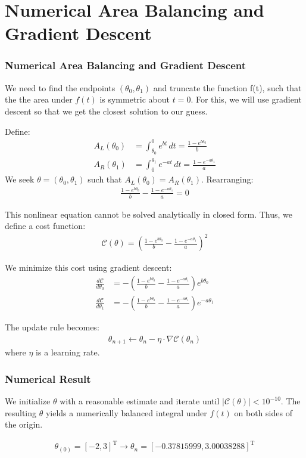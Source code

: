 \documentclass{beamer}
\theoremstyle{remark}
\numberwithin{equation}{section}
\begin{document}
\section{Numerical Area Balancing and Gradient Descent}
\begin{frame}
\frametitle{Numerical Area Balancing and Gradient Descent}
We need to find the endpoints $(\theta_0, \theta_1)$ and truncate the function f(t), such that the the area under $f(t)$ is symmetric about $t=0$. For this, we will use gradient descent so that we get the closest solution to our guess.
	
	Define:
	\begin{align}
		A_L(\theta_0) &= \int_{\theta_0}^{0} e^{bt} \, dt = \frac{1 - e^{b\theta_0}}{b} \\
		A_R(\theta_1) &= \int_{0}^{\theta_1} e^{-at} \, dt = \frac{1 - e^{-a\theta_1}}{a}
	\end{align}
	We seek $\theta = (\theta_0, \theta_1)$ such that $A_L(\theta_0) = A_R(\theta_1)$. Rearranging:
	\begin{align}
		\frac{1 - e^{b\theta_0}}{b} - \frac{1 - e^{-a\theta_1}}{a} = 0
	\end{align}
\end{frame}

\begin{frame}
This nonlinear equation cannot be solved analytically in closed form. Thus, we define a cost function:
	\begin{align}
		\mathcal{C}(\theta) =\left(  \frac{1 - e^{b\theta_0}}{b} - \frac{1 - e^{-a\theta_1}}{a} \right) ^ 2
	\end{align}
	
	We minimize this cost using gradient descent:
	\begin{align}
		\frac{d\mathcal{C}}{d\theta_0} &= -\left(  \frac{1 - e^{b\theta_0}}{b} - \frac{1 - e^{-a\theta_1}}{a} \right) e^{b\theta_0} \\
		\frac{d\mathcal{C}}{d\theta_1} &= -\left(  \frac{1 - e^{b\theta_0}}{b} - \frac{1 - e^{-a\theta_1}}{a} \right) e^{-a\theta_1}
	\end{align}
	
	The update rule becomes:
	\begin{align}
		\theta_{n+1} \leftarrow \theta_{n} - \eta \cdot \nabla \mathcal{C}(\theta_n)
	\end{align}
	where $\eta$ is a learning rate.
\end{frame}

\begin{frame}
\frametitle{Numerical Result}
We initialize $\theta$ with a reasonable estimate and iterate until $|\mathcal{C}(\theta)| < 10^{-10}$. The resulting $\theta$ yields a numerically balanced integral under $f(t)$ on both sides of the origin.
	
	\begin{align}
		\theta_{(0)} = [-2, 3]^\text{T} \rightarrow \theta_{n} = [-0.37815999 , 3.00038288]^\text{T}
	\end{align}
\end{frame}
\end{document}
